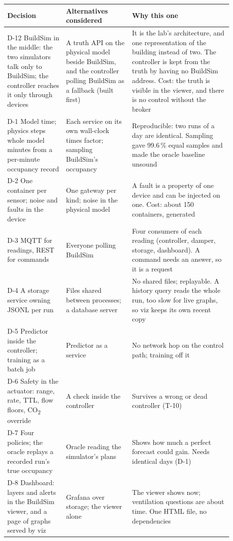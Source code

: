 \documentclass[11pt]{article}
\newcommand{\cotwo}{CO\textsubscript{2}}
\begin{document}
\begin{longtable}[]{@{}>{\raggedright\arraybackslash}p{0.24\linewidth}>{\raggedright\arraybackslash}p{0.27\linewidth}>{\raggedright\arraybackslash}p{0.41\linewidth}@{}}
\toprule
\textbf{Decision} & \textbf{Alternatives considered} & \textbf{Why this one} \\
\midrule
\endhead
D-12 BuildSim in the middle: the two simulators talk only to BuildSim; the controller reaches it only through devices & A truth API on the physical model beside BuildSim, and the controller polling BuildSim as a fallback (built first) & It is the lab's architecture, and one representation of the building instead of two. The controller is kept from the truth by having no BuildSim address. Cost: the truth is visible in the viewer, and there is no control without the broker \\
D-1 Model time; physics steps whole model minutes from a per-minute occupancy record & Each service on its own wall-clock times factor; sampling BuildSim's occupancy & Reproducible: two runs of a day are identical. Sampling gave 99.6\,\% equal samples and made the oracle baseline unsound \\
D-2 One container per sensor; noise and faults in the device & One gateway per kind; noise in the physical model & A fault is a property of one device and can be injected on one. Cost: about 150 containers, generated \\
D-3 MQTT for readings, REST for commands & Everyone polling BuildSim & Four consumers of each reading (controller, damper, storage, dashboard). A command needs an answer, so it is a request \\
D-4 A storage service owning JSONL per run & Files shared between processes; a database server & No shared files; replayable. A history query reads the whole run, too slow for live graphs, so viz keeps its own recent copy \\
D-5 Predictor inside the controller; training as a batch job & Predictor as a service & No network hop on the control path; training off it \\
D-6 Safety in the actuator: range, rate, TTL, flow floors, \cotwo{} override & A check inside the controller & Survives a wrong or dead controller (T-10) \\
D-7 Four policies; the oracle replays a recorded run's true occupancy & Oracle reading the simulator's plans & Shows how much a perfect forecast could gain. Needs identical days (D-1) \\
D-8 Dashboard: layers and alerts in the BuildSim viewer, and a page of graphs served by viz & Grafana over storage; the viewer alone & The viewer shows now; ventilation questions are about time. One HTML file, no dependencies \\

\end{longtable}
\end{document}
